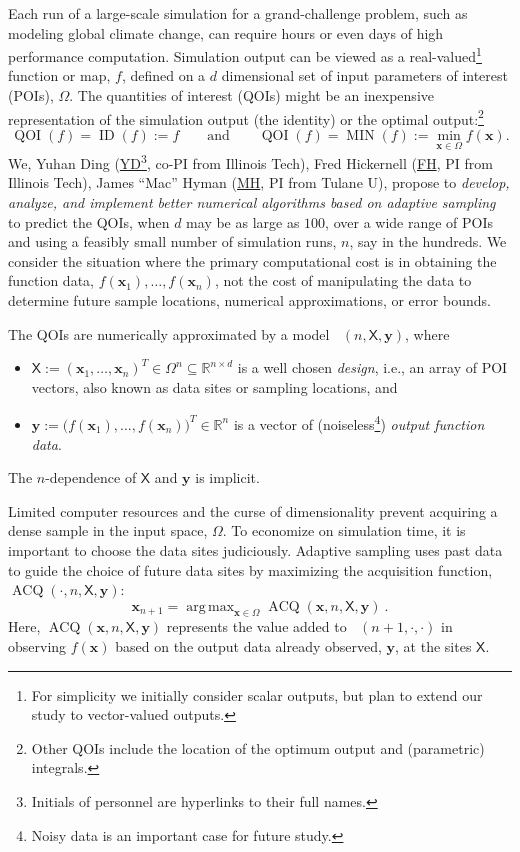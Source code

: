 \documentclass[11pt]{NSFamsart}
\newcommand{\FH}{\hyperlink{FHlink}{FH}\xspace}
\newcommand{\MH}{\hyperlink{MHlink}{MH}\xspace}
\newcommand{\YD}{\hyperlink{YDlink}{YD}\xspace}
\DeclareMathOperator*{\argmax}{arg\,max}
\DeclareMathOperator{\QOI}{QOI} %
\DeclareMathOperator{\APP}{\widehat{\QOI}}
\DeclareMathOperator{\VAL}{ACQ}
\DeclareMathOperator{\MIN}{MIN}
\DeclareMathOperator{\ID}{ID}
\newcommand{\reals}{{\mathbb{R}}}
\newcommand{\mX}{\mathsf{X}}
\newcommand{\bx}{{\boldsymbol{x}}}
\newcommand{\by}{{\boldsymbol{y}}}
\begin{document}
Each run of a large-scale simulation for a grand-challenge problem, such as modeling global climate change, can require hours or even days of high performance computation. Simulation output can be viewed as a real-valued\footnote{For simplicity we initially consider scalar outputs, but plan to extend our study to vector-valued outputs.}  function or map, $f$, defined on a $d$ dimensional set of input parameters of interest (POIs), $\Omega$. The quantities of interest (QOIs) might be 
an inexpensive representation of the simulation output (the identity) or the optimal output:\footnote{Other QOIs include the location of the optimum output and (parametric) integrals.} 
\begin{equation} \label{eq:ourQOIs}
\QOI(f) = \ID(f) := f \qquad \text{and} \qquad \QOI(f) = \MIN(f) := \min_{\bx \in \Omega} f(\bx).
\end{equation}
We,  \hypertarget{YDlink}{Yuhan Ding} (\YD\footnote{Initials of personnel are hyperlinks to their full names.}, co-PI from Illinois Tech), \hypertarget{FHlink}{Fred Hickernell} (\FH, PI from Illinois Tech), \hypertarget{MHlink}{James ``Mac'' Hyman} (\MH, PI from Tulane U),  propose to \emph{develop, analyze, and implement better numerical algorithms based on adaptive sampling} to predict the QOIs, when $d$ may be as large as $100$, over a wide range of POIs and using a feasibly small number of simulation runs, $n$, say in the hundreds. We consider the situation where the primary computational cost is in obtaining the function data, $f(\bx_1), \ldots, f(\bx_n)$, not the cost of manipulating the data to determine future sample locations, numerical approximations, or error bounds. 

The QOIs are numerically approximated by a model $\APP(n,\mX,\by)$, where 
\begin{itemize}
\item $\mX := (\bx_1, \ldots, \bx_n)^T \in \Omega^{n} \subseteq \reals^{n \times d}$ is a well chosen \emph{design}, i.e., an array of POI vectors, also known as data sites or sampling locations, and
\item $\by := \bigl(f(\bx_1), \ldots, f(\bx_n) \bigr)^T \in \reals^n$ is a vector of (noiseless\footnote{Noisy data is an important case for future study.}) \emph{output function data}.
\end{itemize} 
The $n$-dependence of $\mX$ and $\by$ is implicit. 

Limited computer resources and the curse of dimensionality prevent acquiring a dense sample in the input space, $\Omega$. To economize on simulation time, it is important to choose the data sites judiciously. Adaptive sampling uses past data to guide the choice of future data sites by maximizing the acquisition function, $\VAL(\cdot,n,\mX, \by)$: 
\begin{equation} \label{eq:nextsample}
\bx_{n+1} = \argmax_{\bx \in \Omega} \VAL(\bx,n,\mX, \by)~.
\end{equation}
Here, $\VAL(\bx,n,\mX, \by)$ represents the value added to $\APP(n+1,\cdot,\cdot)$ in observing $f(\bx)$ based on the output data already observed, $\by$, at the sites $\mX$. 
\end{document}
